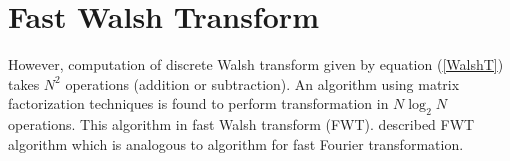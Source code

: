 \section{Fast Walsh Transform}
However, computation of discrete Walsh transform given by equation (\ref{WalshT}) takes $N^2$ operations (addition or subtraction).
An algorithm using matrix factorization techniques is found to perform transformation in $N \log_2 N$ operations.
This algorithm in fast Walsh transform (FWT). 
\cite{Shanks1969} described FWT algorithm which is analogous to \cite{CooleyTukey1965} algorithm for fast Fourier transformation. 




